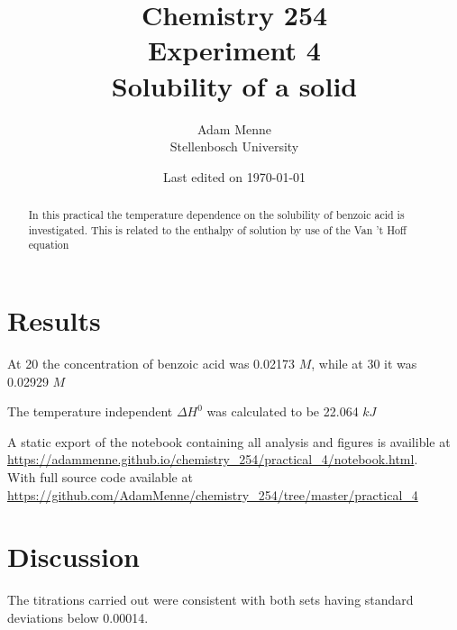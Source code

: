 \documentclass[a4paper, british]{article}
\title{Chemistry 254\\ Experiment 4\\ Solubility of a solid}
\date{Last edited on \today}
\author{Adam Menne\\ Stellenbosch University}
\begin{document}
\maketitle

\begin{abstract}
\noindent
In this practical the temperature dependence on the solubility of benzoic acid is investigated. This is related to the enthalpy of solution by use of the Van 't Hoff equation
\end{abstract}

\tableofcontents

\newpage


\section{Results}

At 20 \textcelsius{} the concentration of benzoic acid was 0.02173 \(M\), while at 30 \textcelsius{} it was 0.02929 \(M\)

The temperature independent \(\Delta H^0\) was calculated to be 22.064 \(kJ\)

A static export of the notebook containing all analysis and figures is availible at \url{https://adammenne.github.io/chemistry_254/practical_4/notebook.html}.\\ With full source code available at \url{https://github.com/AdamMenne/chemistry_254/tree/master/practical_4}

\section{Discussion}

The titrations carried out were consistent with both sets having standard deviations below 0.00014.

\newpage
\end{document}
